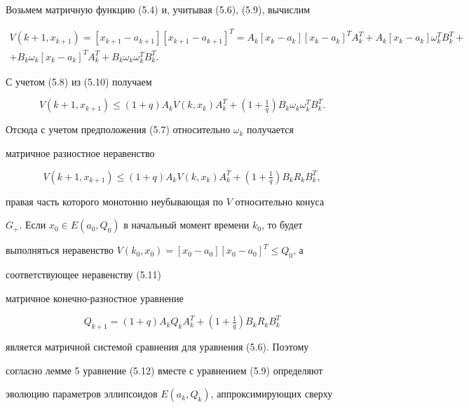 Возьмем матричную функцию (5.4) и, учитывая (5.6), (5.9), вычислим


\begin{multline}


V(k+1,x_{k+1})=[x_{k+1}-a_{k+1}][x_{k+1}-a_{k+1}]^T=A_k[x_k-a_k]


[x_k-a_k]^T A^T_k+A_k[x_k-a_k]\omega^T_k B^T_k+\\


+B_k\omega_k[x_k-a_k]^T A^T_k+B_k\omega_k\omega^T_k B^T_k.


\end{multline}


С учетом (5.8) из (5.10) получаем


$$


V(k+1,x_{k+1})\le(1+q)A_k V(k,x_k)A^T_k+(1+\tfrac{1}{q})


B_k\omega_k\omega^T_k B^T_k.


$$


Отсюда с учетом предположения (5.7) относительно $\omega_k$ получается


матричное разностное неравенство


\begin{equation}


V(k+1,x_{k+1})\le(1+q)A_k V(k,x_k)A^T_k+(1+\tfrac{1}{q})


B_k R_k B^T_k,


\end{equation}


правая часть которого монотонно неубывающая по $V$ относительно конуса


$G_+$. Если $x_0\in E(a_0,Q_0)$ в начальный момент времени $k_0$, то будет


выполняться неравенство $V(k_0,x_0)=[x_0-a_0][x_0-a_0]^T\le Q_0$, а


соответствующее неравенству (5.11)


матричное конечно-разностное уравнение


\begin{equation}


Q_{k+1}=(1+q)A_k Q_k A^T_k+(1+\tfrac{1}{q})B_k R_k B^T_k


\end{equation}


является матричной системой сравнения для уравнения (5.6). Поэтому


согласно лемме 5 уравнение (5.12) вместе с уравнением (5.9) определяют


эволюцию параметров эллипсоидов $E(a_k,Q_k)$, аппроксимирующих сверху


